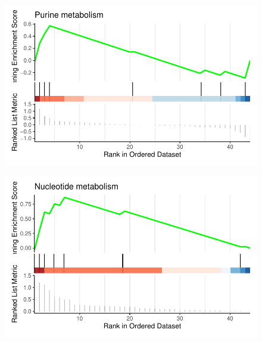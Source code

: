 \documentclass[
  24px,
  letterpaper,
  DIV=11,
  numbers=noendperiod]{scrartcl}
\newenvironment{Shaded}{\begin{snugshade}}{\end{snugshade}}
\newcommand{\AttributeTok}[1]{\textcolor[rgb]{0.40,0.45,0.13}{#1}}
\newcommand{\DecValTok}[1]{\textcolor[rgb]{0.68,0.00,0.00}{#1}}
\newcommand{\FunctionTok}[1]{\textcolor[rgb]{0.28,0.35,0.67}{#1}}
\newcommand{\NormalTok}[1]{\textcolor[rgb]{0.00,0.23,0.31}{#1}}
\newcommand{\SpecialCharTok}[1]{\textcolor[rgb]{0.37,0.37,0.37}{#1}}
\begin{document}
\begin{figure}[H]

{\centering \includegraphics{index_files/figure-pdf/unnamed-chunk-42-1.pdf}

}

\end{figure}

\begin{Shaded}
\end{Shaded}

\begin{figure}[H]

{\centering \includegraphics{index_files/figure-pdf/unnamed-chunk-42-2.pdf}

}

\end{figure}
\end{document}
